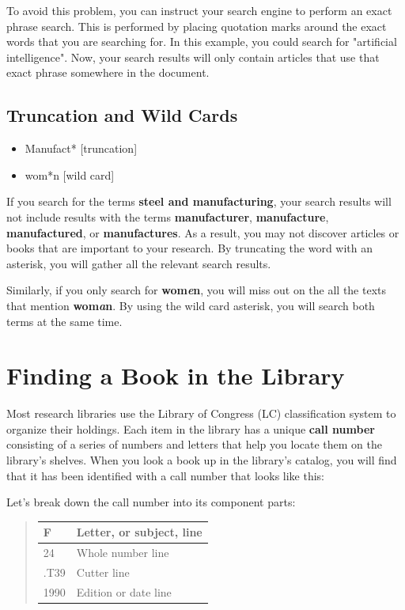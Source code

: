 \documentclass[book]{memoir}
\begin{document}
To avoid this problem, you can instruct your search engine to perform an exact phrase search. This is performed by placing quotation marks around the exact words that you are searching for. In this example, you could search for "artificial intelligence". Now, your search results will only contain articles that use that exact phrase somewhere in the document.

\subsection{Truncation and Wild Cards}
\begin{itemize}
\item Manufact\** [truncation]
\item wom\**n [wild card]
\end{itemize}
If you search for the terms \textbf{steel and manufacturing}, your search results will not include results with the terms \textbf{manufacturer}, \textbf{manufacture}, \textbf{manufactured}, or \textbf{manufactures}. As a result, you may not discover articles or books that are important to your research. By truncating the word with an asterisk, you will gather all the relevant search results. 

Similarly, if you only search for \textbf{wom\emph{e}n}, you will miss out on the all the texts that mention \textbf{wom\emph{a}n}. By using the wild card asterisk, you will search both terms at the same time.

\section{Finding a Book in the Library}

Most research libraries use the Library of Congress (LC) classification system to organize their holdings. Each item in the library has a unique \textbf{call number} consisting of a series of numbers and letters that help you locate them on the library's shelves. When you look a book up in the library's catalog, you will find that it has been identified with a call number that looks like this: 

\begin{quote}
\hspace{.4in}{\huge F 24 .T39 1990}
\end{quote}

Let's break down the call number into its component parts:

\begin{quote}
\hspace{.4in}\begin{tabular}{ |l|l| }
  \hline
  F & Letter, or subject, line \\ \hline
  24 & Whole number line \\
  \hline
  .T39 & Cutter line \\ \hline
  1990 & Edition or date line\\ \hline
\end{tabular}
\end{quote}
\end{document}
